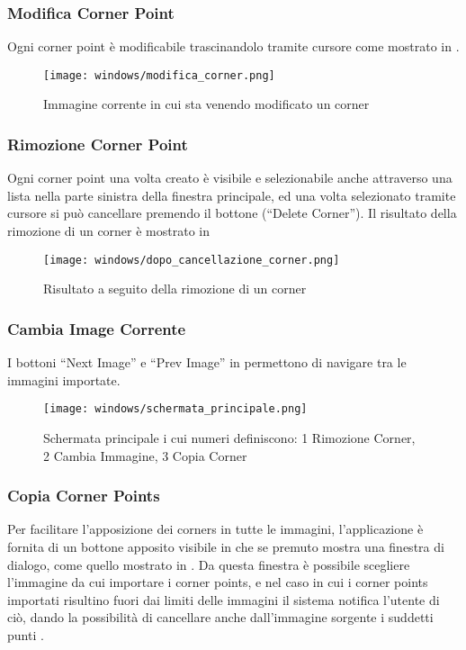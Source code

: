 \subsubsection{Modifica Corner Point}
\noindent Ogni corner point è modificabile trascinandolo tramite cursore come mostrato in .
\begin{figure}[H]
    \centering
    \texttt{[image: windows/modifica\_corner.png]}
    \caption{Immagine corrente in cui sta venendo modificato un corner}
    \label{fig:11}
\end{figure}

\subsubsection{Rimozione Corner Point}
\noindent Ogni corner point una volta creato è visibile e selezionabile anche attraverso una lista nella parte sinistra della finestra principale, ed una volta selezionato tramite cursore si può cancellare premendo il bottone  (``Delete Corner''). Il risultato della rimozione di un corner è mostrato in 

\begin{figure}[H]
    \centering
    \texttt{[image: windows/dopo\_cancellazione\_corner.png]}
    \caption{Risultato a seguito della rimozione di un corner}
    \label{fig:12}
\end{figure}

\subsubsection{Cambia Image Corrente}
\noindent I bottoni ``Next Image'' e ``Prev Image'' in  permettono di navigare tra le immagini importate.

\begin{figure}[H]
    \centering
    \texttt{[image: windows/schermata\_principale.png]}
    \caption{Schermata principale i cui numeri definiscono: 1 Rimozione Corner, 2 Cambia Immagine, 3 Copia Corner}
    \label{fig:13}
\end{figure}


\subsubsection{Copia Corner Points}
\noindent Per facilitare l'apposizione dei corners in tutte le immagini, l'applicazione è fornita di un bottone apposito visibile in  che se premuto mostra una finestra di dialogo, come quello mostrato in . Da questa finestra è possibile scegliere l'immagine da cui importare i corner points, e nel caso in cui i corner points importati risultino fuori dai limiti delle immagini il sistema notifica l'utente di ciò, dando la possibilità di cancellare anche dall'immagine sorgente i suddetti punti .

